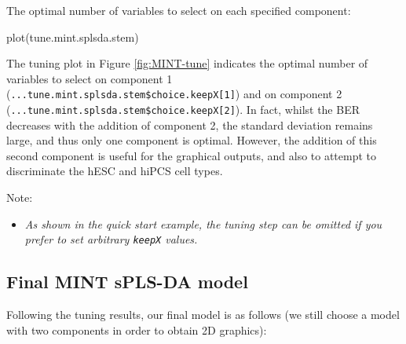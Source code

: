 \documentclass[
]{book}
\newenvironment{Shaded}{\begin{snugshade}}{\end{snugshade}}
\newcommand{\AttributeTok}[1]{\textcolor[rgb]{0.77,0.63,0.00}{#1}}
\newcommand{\CommentTok}[1]{\textcolor[rgb]{0.56,0.35,0.01}{\textit{#1}}}
\newcommand{\DecValTok}[1]{\textcolor[rgb]{0.00,0.00,0.81}{#1}}
\newcommand{\FunctionTok}[1]{\textcolor[rgb]{0.00,0.00,0.00}{#1}}
\newcommand{\NormalTok}[1]{#1}
\newcommand{\OtherTok}[1]{\textcolor[rgb]{0.56,0.35,0.01}{#1}}
\newcommand{\SpecialCharTok}[1]{\textcolor[rgb]{0.00,0.00,0.00}{#1}}
\providecommand{\tightlist}{%
  \setlength{\itemsep}{0pt}\setlength{\parskip}{0pt}}
\begin{document}
The optimal number of variables to select on each specified component:

\begin{Shaded}
\end{Shaded}

\begin{Shaded}
\begin{Highlighting}[]
\FunctionTok{plot}\NormalTok{(tune.mint.splsda.stem)}
\end{Highlighting}
\end{Shaded}



The tuning plot in Figure \ref{fig:MINT-tune} indicates the optimal number of variables to select on component 1 (\texttt{...tune.mint.splsda.stem\$choice.keepX{[}1{]}}) and on component 2 (\texttt{...tune.mint.splsda.stem\$choice.keepX{[}2{]}}). In fact, whilst the BER decreases with the addition of component 2, the standard deviation remains large, and thus only one component is optimal. However, the addition of this second component is useful for the graphical outputs, and also to attempt to discriminate the hESC and hiPCS cell types.

Note:

\begin{itemize}
\tightlist
\item
  \emph{As shown in the quick start example, the tuning step can be omitted if you prefer to set arbitrary \texttt{keepX} values.}
\end{itemize}

\hypertarget{final-mint-spls-da-model}{%
\subsection{Final MINT sPLS-DA model}\label{final-mint-spls-da-model}}

Following the tuning results, our final model is as follows (we still choose a model with two components in order to obtain 2D graphics):

\begin{Shaded}
\end{Shaded}
\end{document}
